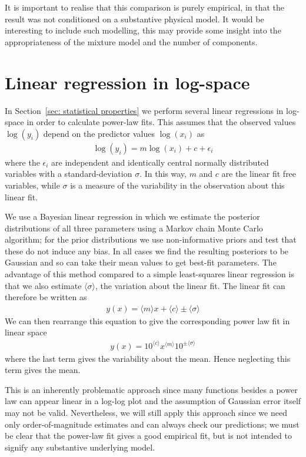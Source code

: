 \documentclass[../full_thesis/full_thesis.tex]{subfiles}
\begin{document}
\begin{subappendices}
It is important to realise that this comparison is purely
empirical, in that the result was not conditioned on a substantive physical
model. It would be interesting to include such modelling, this may provide some
insight into the appropriateness of the mixture model and the number of
components.

\section{Linear regression in log-space}
\label{sec: linear regression in log-space}
In Section~\ref{sec: statistical properties} we perform several linear regressions
in log-space in order to calculate power-law fits. This assumes that the observed
values $\log(y_i)$ depend on the predictor values $\log(x_{i})$ as
\begin{align}
\log(y_i) = m \log(x_i) + c + \epsilon_i
\label{eqn: linear regression}
\end{align}
where the $\epsilon_i$ are independent and
identically central normally  distributed variables with a standard-deviation $\sigma$.
In this way, $m$ and $c$ are the linear fit free variables, while $\sigma$ is
a measure of the variability in the observation about this linear fit.

We use a Bayesian linear regression in which we estimate the posterior distributions
of all three parameters using a Markov chain Monte Carlo algorithm; for the prior
distributions we use non-informative priors and test that these do not induce
any bias. In all cases we find the resulting posteriors to be Gaussian and so
can take their mean values to get best-fit parameters.
The advantage of this
method compared to a simple least-squares linear regression is that we also estimate
$\langle\sigma\rangle$, the variation about the linear fit. The linear fit can
therefore be written as
\begin{align}
y(x) = \langle m \rangle x + \langle c \rangle \pm \langle \sigma \rangle
\end{align}
We can then rearrange this equation to give the corresponding power law fit
in linear space
\begin{align}
y(x) = 10^{\langle c\rangle}x^{\langle m \rangle} 10^{\pm \langle\sigma\rangle}
\end{align}
where the last term gives the variability about the mean. Hence neglecting
this term gives the mean.

This is an inherently problematic approach since many functions besides a
power law can appear linear in a log-log plot and the assumption of
Gaussian error itself may not be valid. Nevertheless, we will still apply this
approach since we need only order-of-magnitude estimates and can always check
our predictions; we must be clear that the power-law fit gives a good empirical
fit, but is not intended to signify any substantive underlying model.



\end{subappendices}
\end{document}
